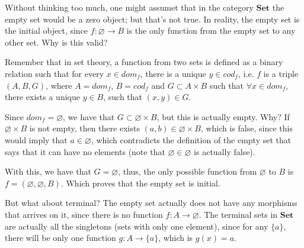 \begin{example}
Without thinking too much, one might assumet that in the category $\mathbf{Set}$
the empty set would be a zero object; but that's not true.
In reality, the empty set is the initial object, since $f:\varnothing \to B$
is the only function from the empty set to any other set. Why is this valid?

Remember that in set theory, a function from two sets is defined as a binary
relation such that for every $x \in dom_f$, there is a unique $y \in cod_f$, i.e.
$f$ is a triple $(A,B,G)$, where $A = dom_f$, $B = cod_f$ and $G \subset A \times B$
such that $\forall x \in dom_f$, there exists a unique $y \in B$, such that $(x,y) \in G$.

Since $dom_f = \varnothing$, we have that $G \subset \varnothing \times B$, but this
is actually empty. Why? If $\varnothing \times B$ is not empty, then there exists
$(a,b) \in \varnothing \times B$, which is false, since this would imply that
$a \in \varnothing$, which contradicts the definition of the empty set that says
that it can have no elements (note that $\varnothing \in \varnothing$ is actually false).

With this, we have that $G = \varnothing$, thus, the only possible function from
$\varnothing$ to $B$ is $f = (\varnothing, \varnothing, B)$. Which proves that the
empty set is initial.

But what about terminal? The empty set actually does not have any morphisms
that arrives on it, since there is no function $f:A \to \varnothing$.
The terminal sets in $\mathbf{Set}$ are actually all the singletons (sets with only
one element), since for any $\{a\}$, there will be only one function
$g: A \to \{a\}$, which is $g(x) = a$.
\label{ex:InitialTerminalSet}
\end{example}

